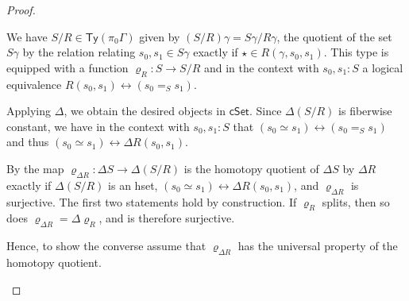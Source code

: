 \documentclass[10pt,a4paper]{article}
\newcommand{\cSet}{\mathsf{cSet}}
\newcommand\Ty{\mathsf{Ty}}
\begin{document}
\begin{proof}
  \begin{description}[font=\normalfont,leftmargin=0cm]
  \item[\ref{prop:set-quotient-is-homotopy-quotient-iff-surjection-splits:well-defined}] 
    We have \(S/R \in \Ty(\pi_0\Gamma)\) given by \((S/R)\gamma = S\gamma / R\gamma\), the quotient of the set \(S\gamma\) by the relation relating \(s_0, s_1 \in S\gamma\) exactly if \(\star \in R(\gamma, s_0, s_1)\).
    This type is equipped with a function \(\varrho_R \colon S \to S/R\) and in the context with \(s_0, s_1 \colon S\) a logical equivalence \(R(s_0, s_1) \leftrightarrow (s_0 =_S s_1)\).

    Applying \(\Delta\), we obtain the desired objects in \(\cSet\).
    Since \(\Delta(S/R)\) is fiberwise constant, we have in the context with \(s_0, s_1 \colon S\) that \((s_0 \simeq s_1) \leftrightarrow (s_0 =_S s_1)\) and thus \((s_0 \simeq s_1) \leftrightarrow \Delta R(s_0, s_1)\).
  
  \item[\ref{prop:set-quotient-is-homotopy-quotient-iff-surjection-splits:characterization}] %
    By \cite[Theorem 18.2.3]{rijke2025intro} the map \(\varrho_{\Delta R} \colon \Delta S \to \Delta(S/R)\) is the homotopy quotient of \(\Delta S\) by \(\Delta R\) exactly if \(\Delta(S/R)\) is an hset, \((s_0 \simeq s_1) \leftrightarrow \Delta R(s_0, s_1)\), and \(\varrho_{\Delta R}\) is surjective.
    The first two statements hold by construction.
    If \(\varrho_R\) splits, then so does \(\varrho_{\Delta R} = \Delta \varrho_{R}\), and is therefore surjective.

    Hence, to show the converse assume that \(\varrho_{\Delta R}\) has the universal property of the homotopy quotient.

  \end{description}
\end{proof}

\end{document}
